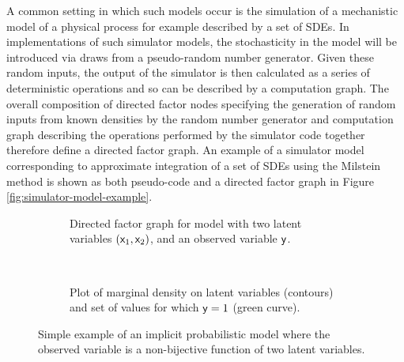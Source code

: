 A common setting in which such models occur is the simulation of a mechanistic model of a physical process for example described by a set of \acfp{SDE}. In implementations of such simulator models, the stochasticity in the model will be introduced via draws from a pseudo-random number generator. Given these random inputs, the output of the simulator is then calculated as a series of deterministic operations and so can be described by a computation graph. The overall composition of directed factor nodes specifying the generation of random inputs from known densities by the random number generator and computation graph describing the operations performed by the simulator code together therefore define a directed factor graph. An example of a simulator model corresponding to approximate integration of a set of \acp{SDE} using the Milstein method \citep{mil1975approximate} is shown as both pseudo-code and a directed  factor graph in Figure \ref{fig:simulator-model-example}.


\begin{figure}[t]
\centering
\begin{subfigure}[b]{.48\linewidth}
\centering
{}
\caption{Directed factor graph for model with two latent variables $(\mathsf{x}_1, \mathsf{x}_2)$, and an observed variable $\mathsf{y}$.}
\label{sfig:simple-impl-factor-graph}
\end{subfigure}
~~
\begin{subfigure}[b]{.48\linewidth}
\centering
{}
\caption{Plot of marginal density on latent variables (contours) and set of values for which $\mathsf{y} = 1$ (green curve).}
\label{sfig:example-implicit-model-cond-plot}
\end{subfigure}
\caption[Example of implicit probabilistic model.]{Simple example of an implicit probabilistic model where the observed variable is a non-bijective function of two latent variables.}
\label{fig:example-non-bijective-transform-factor-graph}
\end{figure}

